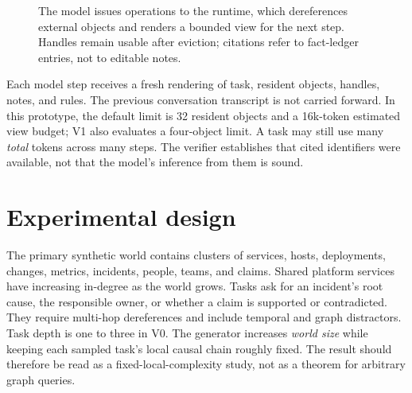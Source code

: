 \documentclass[10pt,letterpaper]{article}
\begin{document}
\begin{figure}[t]
\centering
{}
\caption{The model issues operations to the runtime, which dereferences external objects and renders a bounded view for the next step. Handles remain usable after eviction; citations refer to fact-ledger entries, not to editable notes.}
\label{fig:system}
\end{figure}

Each model step receives a fresh rendering of task, resident objects, handles, notes, and rules. The previous conversation transcript is not carried forward. In this prototype, the default limit is 32 resident objects and a 16k-token estimated view budget; V1 also evaluates a four-object limit. A task may still use many \emph{total} tokens across many steps. The verifier establishes that cited identifiers were available, not that the model's inference from them is sound.

\section{Experimental design}

The primary synthetic world contains clusters of services, hosts, deployments, changes, metrics, incidents, people, teams, and claims. Shared platform services have increasing in-degree as the world grows. Tasks ask for an incident's root cause, the responsible owner, or whether a claim is supported or contradicted. They require multi-hop dereferences and include temporal and graph distractors. Task depth is one to three in V0. The generator increases \emph{world size} while keeping each sampled task's local causal chain roughly fixed. The result should therefore be read as a fixed-local-complexity study, not as a theorem for arbitrary graph queries.
\end{document}

